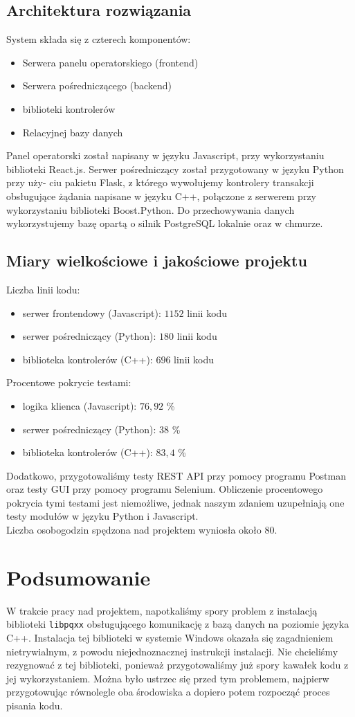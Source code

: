 \documentclass{article}
\begin{document}
\subsection{Architektura rozwiązania}
System składa się z czterech komponentów:
\begin{itemize}
\item Serwera panelu operatorskiego (frontend)
\item Serwera pośredniczącego (backend)
\item biblioteki kontrolerów 
\item Relacyjnej bazy danych
\end{itemize}
Panel operatorski został napisany w języku Javascript, przy wykorzystaniu
biblioteki React.js. Serwer pośredniczący został przygotowany w języku Python przy uży-
ciu pakietu Flask, z którego wywołujemy kontrolery transakcji obsługujące żądania
napisane w języku C++, połączone z serwerem przy wykorzystaniu biblioteki
Boost.Python. Do przechowywania danych wykorzystujemy bazę opartą o silnik PostgreSQL
lokalnie oraz w chmurze.

\subsection{Miary wielkościowe i jakościowe projektu}
Liczba linii kodu:
\begin{itemize}
    \item serwer frontendowy (Javascript): $1152$ linii kodu
    \item serwer pośredniczący (Python): $180$ linii kodu
    \item biblioteka kontrolerów (C++): $696$ linii kodu
\end{itemize}

Procentowe pokrycie testami:
\begin{itemize}
    \item logika klienca (Javascript): $76,92$ \%
    \item serwer pośredniczący (Python): $38$ \%
    \item biblioteka kontrolerów (C++): $83,4$ \%
\end{itemize}
Dodatkowo, przygotowaliśmy testy REST API przy pomocy programu Postman oraz testy
GUI przy pomocy programu Selenium. Obliczenie procentowego pokrycia tymi testami 
jest niemożliwe, jednak naszym zdaniem uzupełniają one testy modułów w języku Python
i Javascript.\\

Liczba osobogodzin spędzona nad projektem wyniosła około 80.
\section{Podsumowanie}
W trakcie pracy nad projektem, napotkaliśmy spory problem z instalacją biblioteki \texttt{libpqxx}
obsługującego komunikację z bazą danych na poziomie języka C++. Instalacja tej biblioteki w systemie Windows
okazała się zagadnieniem nietrywialnym, z powodu niejednoznacznej instrukcji instalacji. Nie chcieliśmy 
rezygnować z tej biblioteki, ponieważ przygotowaliśmy już spory kawałek kodu z jej wykorzystaniem. Można było ustrzec się
przed tym problemem, najpierw przygotowując równolegle oba środowiska a dopiero potem rozpocząć
proces pisania kodu. 
\end{document}
